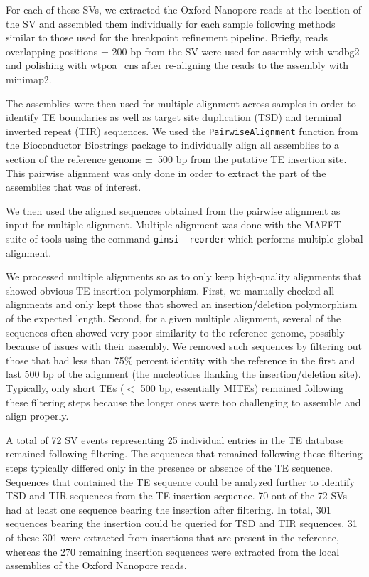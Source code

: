 \documentclass[12pt]{article}
\begin{document}
For each of these SVs, we extracted the Oxford Nanopore reads at the location of the SV and assembled them individually for each sample following methods similar to those used for the breakpoint refinement pipeline.
Briefly, reads overlapping positions ± 200 bp from the SV were used for assembly with wtdbg2 and polishing with wtpoa\_cns after re-aligning the reads to the assembly with minimap2.

The assemblies were then used for multiple alignment across samples in order to identify TE boundaries as well as target site duplication (TSD) and terminal inverted repeat (TIR) sequences.
We used the \texttt{PairwiseAlignment} function from the Bioconductor Biostrings package \citep{biostrings} to individually align all assemblies to a section of the reference genome ±~500 bp from the putative TE insertion site.
This pairwise alignment was only done in order to extract the part of the assemblies that was of interest.

We then used the aligned sequences obtained from the pairwise alignment as input for multiple alignment.
Multiple alignment was done with the MAFFT \citep{mafft} suite of tools using the command \texttt{ginsi --reorder} which performs multiple global alignment.

We processed multiple alignments so as to only keep high-quality alignments that showed obvious TE insertion polymorphism.
First, we manually checked all alignments and only kept those that showed an insertion/deletion polymorphism of the expected length.
Second, for a given multiple alignment, several of the sequences often showed very poor similarity to the reference genome, possibly because of issues with their assembly.
We removed such sequences by filtering out those that had less than 75\% percent identity with the reference in the first and last 500 bp of the alignment (the nucleotides flanking the insertion/deletion site).
Typically, only short TEs ($<$ 500 bp, essentially MITEs) remained following these filtering steps because the longer ones were too challenging to assemble and align properly.

A total of 72 SV events representing 25 individual entries in the TE database remained following filtering.
The sequences that remained following these filtering steps typically differed only in the presence or absence of the TE sequence.
Sequences that contained the TE sequence could be analyzed further to identify TSD and TIR sequences from the TE insertion sequence.
70 out of the 72 SVs had at least one sequence bearing the insertion after filtering.
In total, 301 sequences bearing the insertion could be queried for TSD and TIR sequences.
31 of these 301 were extracted from insertions that are present in the reference, whereas the 270 remaining insertion sequences were extracted from the local assemblies of the Oxford Nanopore reads.
\end{document}
